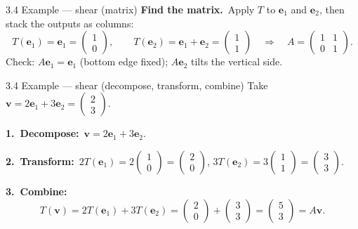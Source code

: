 \documentclass[11pt,aspectratio=169]{beamer}
\begin{document}
\begin{frame}{3.4 Example --- shear (matrix)}
  \footnotesize
  \textbf{Find the matrix.}\
  Apply $T$ to $\mathbf{e}_1$ and $\mathbf{e}_2$, then stack the outputs as columns:
  \[
    T(\mathbf{e}_1)=\mathbf{e}_1=\begin{pmatrix}1\\ 0\end{pmatrix},
    \qquad
    T(\mathbf{e}_2)=\mathbf{e}_1+\mathbf{e}_2=\begin{pmatrix}1\\ 1\end{pmatrix}
    \quad\Longrightarrow\quad
    A=
    \begin{pmatrix}
      1&1\\
      0&1
    \end{pmatrix}.
  \]
  Check: $A\mathbf{e}_1=\mathbf{e}_1$ (bottom edge fixed); $A\mathbf{e}_2$ tilts the vertical side.
\end{frame}

\begin{frame}{3.4 Example --- shear (decompose, transform, combine)}
  \footnotesize
  Take $\mathbf{v}=2\mathbf{e}_1+3\mathbf{e}_2=\begin{pmatrix}2\\ 3\end{pmatrix}$.

  \medskip
  \textbf{1.\ Decompose:}\
  $\mathbf{v}=2\mathbf{e}_1+3\mathbf{e}_2$.

  \medskip
  \textbf{2.\ Transform:}\
  $2T(\mathbf{e}_1)=2\begin{pmatrix}1\\ 0\end{pmatrix}=\begin{pmatrix}2\\ 0\end{pmatrix}$,
  \quad
  $3T(\mathbf{e}_2)=3\begin{pmatrix}1\\ 1\end{pmatrix}=\begin{pmatrix}3\\ 3\end{pmatrix}$.

  \medskip
  \textbf{3.\ Combine:}\
  \[
    T(\mathbf{v})
    =2T(\mathbf{e}_1)+3T(\mathbf{e}_2)
    =\begin{pmatrix}2\\ 0\end{pmatrix}+\begin{pmatrix}3\\ 3\end{pmatrix}
    =\begin{pmatrix}5\\ 3\end{pmatrix}
    =A\mathbf{v}.
  \]
\end{frame}
\end{document}
